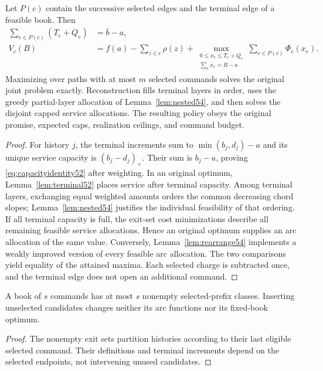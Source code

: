 \begin{theorem}\label{thm:path52}
Let $P(c)$ contain the successive selected edges and the terminal edge of a feasible book. Then
\begin{align}
 \sum_{e\in P(c)}(T_e+Q_e)&=\bar b-a,\label{eq:capacityidentity52}\\
 V_c(B)&=f(a)-\sum_{z\in c}\rho(z)+
 \max_{\substack{0\leq x_e\leq T_e+Q_e\\\sum_e x_e=B-a}}\sum_{e\in P(c)}\Phi_e(x_e).\label{eq:pathidentity52}
\end{align}
Maximizing over paths with at most $m$ selected commands solves the original joint problem exactly. Reconstruction fills terminal layers in order, uses the greedy partial-layer allocation of Lemma~\ref{lem:nested54}, and then solves the disjoint capped service allocations. The resulting policy obeys the original promise, expected caps, realization ceilings, and command budget.
\end{theorem}
\begin{proof}
For history $j$, the terminal increments sum to $\min(b_j,d_j)-a$ and its unique service capacity is $(b_j-d_j)_+$. Their sum is $b_j-a$, proving \eqref{eq:capacityidentity52} after weighting. In an original optimum, Lemma~\ref{lem:terminal52} places service after terminal capacity. Among terminal layers, exchanging equal weighted amounts orders the common decreasing chord slopes; Lemma~\ref{lem:nested54} justifies the individual feasibility of that ordering. If all terminal capacity is full, the exit-set cost minimizations describe all remaining feasible service allocations. Hence an original optimum supplies an arc allocation of the same value. Conversely, Lemma~\ref{lem:rearrange54} implements a weakly improved version of every feasible arc allocation. The two comparisons yield equality of the attained maxima. Each selected charge is subtracted once, and the terminal edge does not open an additional command.
\end{proof}

\begin{corollary}\label{cor:endogenous52}
A book of $s$ commands has at most $s$ nonempty selected-prefix classes. Inserting unselected candidates changes neither its arc functions nor its fixed-book optimum.
\end{corollary}
\begin{proof}
The nonempty exit sets partition histories according to their last eligible selected command. Their definitions and terminal increments depend on the selected endpoints, not intervening unused candidates.
\end{proof}
